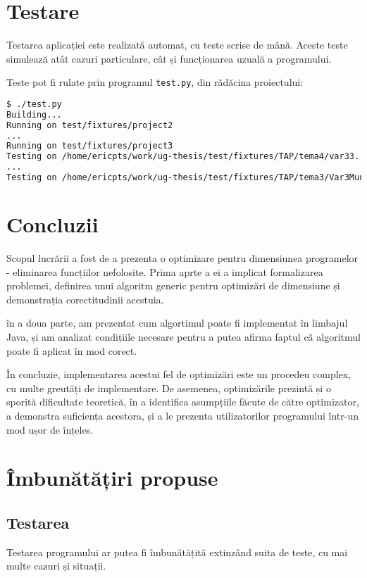 \section{Testare}

Testarea aplicației este realizată automat, cu teste scrise de mână.
Aceste teste simulează atât cazuri particulare, cât și funcționarea uzuală a
programului.

Teste pot fi rulate prin programul \texttt{test.py}, din rădăcina proiectului:

\begin{lstlisting}[language=Bash]
$ ./test.py
Building...
Running on test/fixtures/project2
...
Running on test/fixtures/project3
Testing on /home/ericpts/work/ug-thesis/test/fixtures/TAP/tema4/var33...
...
Testing on /home/ericpts/work/ug-thesis/test/fixtures/TAP/tema3/Var3Munte...
\end{lstlisting}

\section{Concluzii}

Scopul lucrării a fost de a prezenta o optimizare pentru dimensiunea
programelor - eliminarea funcțiilor nefolosite.
Prima aprte a ei a implicat formalizarea problemei, definirea unui algoritm
generic pentru optimizări de dimensiune și demonstrația
corectitudinii acestuia.

în a doua parte, am prezentat cum algortimul poate fi implementat în limbajul
Java, și am analizat condițiile necesare pentru a putea afirma faptul că
algoritmul poate fi aplicat în mod corect.

În concluzie, implementarea acestui fel de optimizări este un procedeu complex,
cu multe greutăți de implementare.
De asemenea, optimizările prezintă și o sporită dificultate teoretică, în a
identifica asumpțiile făcute de către optimizator, a demonstra suficiența
acestora, și a le prezenta utilizatorilor programului într-un mod ușor de
înțeles.

\section{Îmbunătățiri propuse}

\subsection{Testarea}
Testarea programului ar putea fi îmbunătățită extinzând suita de teste, cu mai
multe cazuri și situații.

